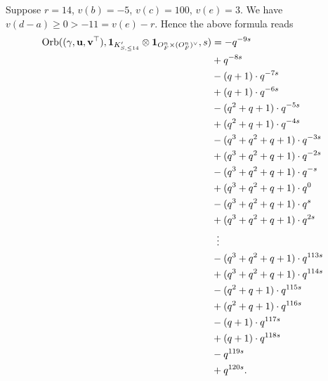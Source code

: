 \begin{example}
  Suppose $r = 14$, $v(b) = -5$, $v(c) = 100$, $v(e) = 3$.
  We have $v(d-a) \ge 0 > -11 = v(e) - r$.
  Hence the above formula reads
  \begin{align*}
    \Orb(\guv, \mathbf{1}_{K'_{S, \le 14}} \otimes \oneV, s)
    &= -q^{-9s} \\
    &+ q^{-8s} \\
    &- (q+1) \cdot q^{-7s} \\
    &+ (q+1) \cdot q^{-6s} \\
    &- (q^2+q+1) \cdot q^{-5s} \\
    &+ (q^2+q+1) \cdot q^{-4s} \\
    &- (q^3+q^2+q+1) \cdot q^{-3s} \\
    &+ (q^3+q^2+q+1) \cdot q^{-2s} \\
    &- (q^3+q^2+q+1) \cdot q^{-s} \\
    &+ (q^3+q^2+q+1) \cdot q^{0} \\
    &- (q^3+q^2+q+1) \cdot q^{s} \\
    &+ (q^3+q^2+q+1) \cdot q^{2s} \\
    &\vdotswithin= \\
    &- (q^3+q^2+q+1) \cdot q^{113s} \\
    &+ (q^3+q^2+q+1) \cdot q^{114s} \\
    &- (q^2+q+1) \cdot q^{115s} \\
    &+ (q^2+q+1) \cdot q^{116s} \\
    &- (q+1) \cdot q^{117s} \\
    &+ (q+1) \cdot q^{118s} \\
    &- q^{119s} \\
    &+ q^{120s}.
  \end{align*}
\end{example}
